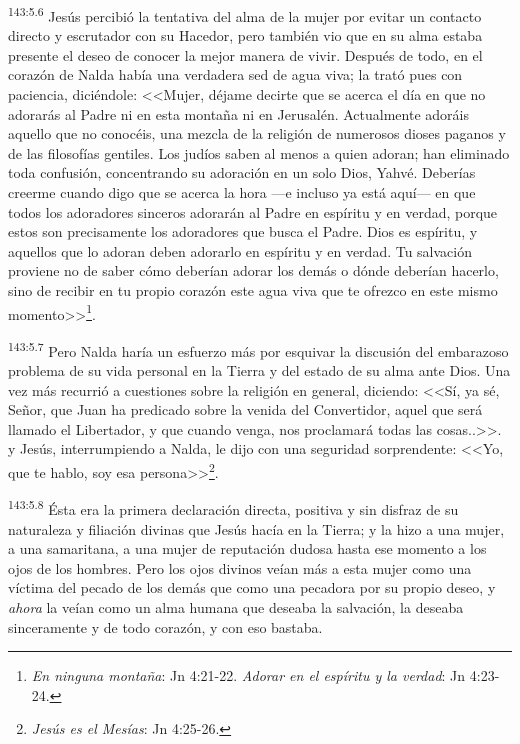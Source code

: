 \par 
\textsuperscript{143:5.6} Jesús percibió la tentativa del alma de la mujer por evitar un contacto directo y escrutador con su Hacedor, pero también vio que en su alma estaba presente el deseo de conocer la mejor manera de vivir. Después de todo, en el corazón de Nalda había una verdadera sed de agua viva; la trató pues con paciencia, diciéndole: <<Mujer, déjame decirte que se acerca el día en que no adorarás al Padre ni en esta montaña ni en Jerusalén. Actualmente adoráis aquello que no conocéis, una mezcla de la religión de numerosos dioses paganos y de las filosofías gentiles. Los judíos saben al menos a quien adoran; han eliminado toda confusión, concentrando su adoración en un solo Dios, Yahvé. Deberías creerme cuando digo que se acerca la hora ---e incluso ya está aquí--- en que todos los adoradores sinceros adorarán al Padre en espíritu y en verdad, porque estos son precisamente los adoradores que busca el Padre. Dios es espíritu, y aquellos que lo adoran deben adorarlo en espíritu y en verdad. Tu salvación proviene no de saber cómo deberían adorar los demás o dónde deberían hacerlo, sino de recibir en tu propio corazón este agua viva que te ofrezco en este mismo momento>>\footnote{\textit{En ninguna montaña}: Jn 4:21-22. \textit{Adorar en el espíritu y la verdad}: Jn 4:23-24.}.

\par 
\textsuperscript{143:5.7} Pero Nalda haría un esfuerzo más por esquivar la discusión del embarazoso problema de su vida personal en la Tierra y del estado de su alma ante Dios. Una vez más recurrió a cuestiones sobre la religión en general, diciendo: <<Sí, ya sé, Señor, que Juan ha predicado sobre la venida del Convertidor, aquel que será llamado el Libertador, y que cuando venga, nos proclamará todas las cosas..>>. y Jesús, interrumpiendo a Nalda, le dijo con una seguridad sorprendente: <<Yo, que te hablo, soy esa persona>>\footnote{\textit{Jesús es el Mesías}: Jn 4:25-26.}.

\par 
\textsuperscript{143:5.8} Ésta era la primera declaración directa, positiva y sin disfraz de su naturaleza y filiación divinas que Jesús hacía en la Tierra; y la hizo a una mujer, a una samaritana, a una mujer de reputación dudosa hasta ese momento a los ojos de los hombres. Pero los ojos divinos veían más a esta mujer como una víctima del pecado de los demás que como una pecadora por su propio deseo, y \textit{ahora} la veían como un alma humana que deseaba la salvación, la deseaba sinceramente y de todo corazón, y con eso bastaba.

